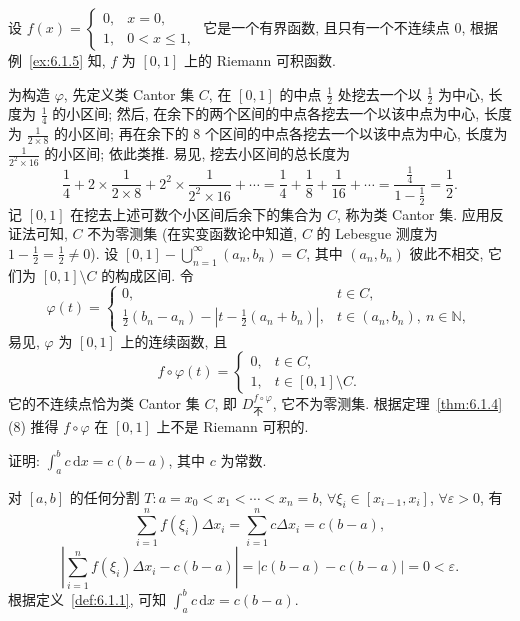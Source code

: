\begin{solution}[反例 2]
设 $f(x)=\begin{cases}0,&x=0,\\1,&0<x\leqslant 1,\end{cases}$ 它是一个有界函数, 且只有一个不连续点 $0$, 根据例~\ref{ex:6.1.5} 知, $f$ 为 $[0,1]$ 上的 Riemann 可积函数.

为构造 $\varphi$, 先定义类 Cantor 集 $C$, 在 $[0,1]$ 的中点 $\frac{1}{2}$ 处挖去一个以 $\frac{1}{2}$ 为中心, 长度为 $\frac{1}{4}$ 的小区间; 然后, 在余下的两个区间的中点各挖去一个以该中点为中心, 长度为 $\frac{1}{2\times 8}$ 的小区间; 再在余下的 $8$ 个区间的中点各挖去一个以该中点为中心, 长度为 $\frac{1}{2^{2}\times 16}$ 的小区间; 依此类推. 易见, 挖去小区间的总长度为
\[
\frac{1}{4}+2\times\frac{1}{2\times 8}+2^{2}\times\frac{1}{2^{2}\times 16}+\cdots=\frac{1}{4}+\frac{1}{8}+\frac{1}{16}+\cdots=\frac{\frac{1}{4}}{1-\frac{1}{2}}=\frac{1}{2}.
\]
记 $[0,1]$ 在挖去上述可数个小区间后余下的集合为 $C$, 称为类 Cantor 集. 应用反证法可知, $C$ 不为零测集 (在实变函数论中知道, $C$ 的 Lebesgue 测度为 $1-\frac{1}{2}=\frac{1}{2}\neq 0$). 设 $[0,1]-\bigcup\limits_{n=1}^{\infty}(a_{n},b_{n})=C$, 其中 $(a_{n},b_{n})$ 彼此不相交, 它们为 $[0,1]\setminus C$ 的构成区间. 令
\[
\varphi(t)=\begin{cases}0,&t\in C,\\\frac{1}{2}(b_{n}-a_{n})-\left|t-\frac{1}{2}(a_{n}+b_{n})\right|,&t\in(a_{n},b_{n}),\ n\in\mathbb{N},\end{cases}
\]
易见, $\varphi$ 为 $[0,1]$ 上的连续函数, 且
\[
f\circ\varphi(t)=\begin{cases}0,&t\in C,\\1,&t\in[0,1]\setminus C.\end{cases}
\]
它的不连续点恰为类 Cantor 集 $C$, 即 $D_{\text{不}}^{f\circ\varphi}$, 它不为零测集. 根据定理~\ref{thm:6.1.4}(8) 推得 $f\circ\varphi$ 在 $[0,1]$ 上不是 Riemann 可积的.
\end{solution}

\begin{example}\label{ex:6.1.11}
证明: $\int_{a}^{b}c\,\mathrm{d}x=c(b-a)$, 其中 $c$ 为常数.
\end{example}

\begin{solution}
对 $[a,b]$ 的任何分割 $T:a=x_{0}<x_{1}<\cdots<x_{n}=b$, $\forall\xi_{i}\in[x_{i-1},x_{i}]$, $\forall\varepsilon>0$, 有
\[
\sum_{i=1}^{n}f(\xi_{i})\Delta x_{i}=\sum_{i=1}^{n}c\Delta x_{i}=c(b-a),
\]
\[
\left|\sum_{i=1}^{n}f(\xi_{i})\Delta x_{i}-c(b-a)\right|=|c(b-a)-c(b-a)|=0<\varepsilon.
\]
根据定义~\ref{def:6.1.1}, 可知 $\int_{a}^{b}c\,\mathrm{d}x=c(b-a)$.
\end{solution}

